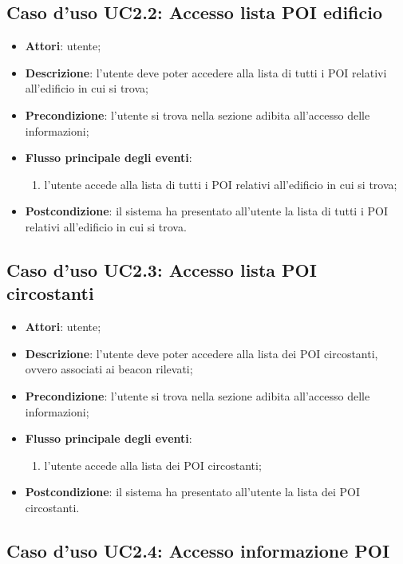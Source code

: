 \documentclass[../AnalisiDeiRequisiti.tex]{subfiles}
\begin{document}
\subsection{Caso d'uso UC2.2: Accesso lista POI edificio}
\begin{itemize}
	\item \textbf{Attori}: utente;
	\item \textbf{Descrizione}: l'utente deve poter accedere alla lista di tutti i POI relativi all'edificio in cui si trova; 
	\item \textbf{Precondizione}: l'utente si trova nella sezione adibita all'accesso delle informazioni;
	
	\item \textbf{Flusso principale degli eventi}:
	\begin{enumerate}
		\item l'utente accede alla lista di tutti i POI relativi all'edificio in cui si trova;
		
	\end{enumerate}
	\item \textbf{Postcondizione}: il sistema ha presentato all'utente la lista di tutti i POI relativi all'edificio in cui si trova.
\end{itemize}
\hypertarget{UC2.3}{}
\subsection{Caso d'uso UC2.3: Accesso lista POI circostanti}
\begin{itemize}
	\item \textbf{Attori}: utente;
	\item \textbf{Descrizione}: l'utente deve poter accedere alla lista dei POI circostanti, ovvero associati ai beacon rilevati; 
	\item \textbf{Precondizione}: l'utente si trova nella sezione adibita all'accesso delle informazioni;
	
	\item \textbf{Flusso principale degli eventi}:
	\begin{enumerate}
		\item l'utente accede alla lista dei POI circostanti;
		
	\end{enumerate}
	\item \textbf{Postcondizione}: il sistema ha presentato all'utente la lista dei POI circostanti.
\end{itemize}
\hypertarget{UC2.4}{}
\subsection{Caso d'uso UC2.4: Accesso informazione POI}
\end{document}
